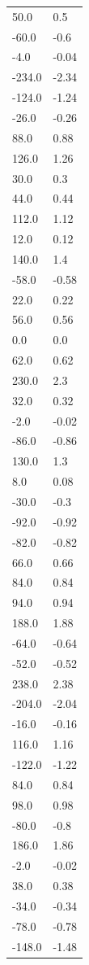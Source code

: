 \begin{longtable}{ll}
50.0 & 0.5 \\
-60.0 & -0.6 \\
-4.0 & -0.04 \\
-234.0 & -2.34 \\
-124.0 & -1.24 \\
-26.0 & -0.26 \\
88.0 & 0.88 \\
126.0 & 1.26 \\
30.0 & 0.3 \\
44.0 & 0.44 \\
112.0 & 1.12 \\
12.0 & 0.12 \\
140.0 & 1.4 \\
-58.0 & -0.58 \\
22.0 & 0.22 \\
56.0 & 0.56 \\
0.0 & 0.0 \\
62.0 & 0.62 \\
230.0 & 2.3 \\
32.0 & 0.32 \\
-2.0 & -0.02 \\
-86.0 & -0.86 \\
130.0 & 1.3 \\
8.0 & 0.08 \\
-30.0 & -0.3 \\
-92.0 & -0.92 \\
-82.0 & -0.82 \\
66.0 & 0.66 \\
84.0 & 0.84 \\
94.0 & 0.94 \\
188.0 & 1.88 \\
-64.0 & -0.64 \\
-52.0 & -0.52 \\
238.0 & 2.38 \\
-204.0 & -2.04 \\
-16.0 & -0.16 \\
116.0 & 1.16 \\
-122.0 & -1.22 \\
84.0 & 0.84 \\
98.0 & 0.98 \\
-80.0 & -0.8 \\
186.0 & 1.86 \\
-2.0 & -0.02 \\
38.0 & 0.38 \\
-34.0 & -0.34 \\
-78.0 & -0.78 \\
-148.0 & -1.48 \\

\end{longtable}
